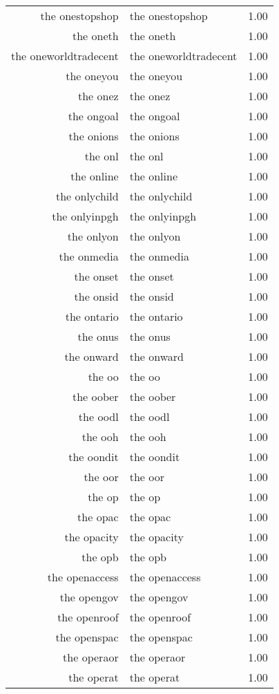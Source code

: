 \begin{table}[ht]
\begin{tabular}{rlr}
  the onestopshop & the onestopshop & 1.00 \\ 
  the oneth & the oneth & 1.00 \\ 
  the oneworldtradecent & the oneworldtradecent & 1.00 \\ 
  the oneyou & the oneyou & 1.00 \\ 
  the onez & the onez & 1.00 \\ 
  the ongoal & the ongoal & 1.00 \\ 
  the onions & the onions & 1.00 \\ 
  the onl & the onl & 1.00 \\ 
  the online & the online & 1.00 \\ 
  the onlychild & the onlychild & 1.00 \\ 
  the onlyinpgh & the onlyinpgh & 1.00 \\ 
  the onlyon & the onlyon & 1.00 \\ 
  the onmedia & the onmedia & 1.00 \\ 
  the onset & the onset & 1.00 \\ 
  the onsid & the onsid & 1.00 \\ 
  the ontario & the ontario & 1.00 \\ 
  the onus & the onus & 1.00 \\ 
  the onward & the onward & 1.00 \\ 
  the oo & the oo & 1.00 \\ 
  the oober & the oober & 1.00 \\ 
  the oodl & the oodl & 1.00 \\ 
  the ooh & the ooh & 1.00 \\ 
  the oondit & the oondit & 1.00 \\ 
  the oor & the oor & 1.00 \\ 
  the op & the op & 1.00 \\ 
  the opac & the opac & 1.00 \\ 
  the opacity & the opacity & 1.00 \\ 
  the opb & the opb & 1.00 \\ 
  the openaccess & the openaccess & 1.00 \\ 
  the opengov & the opengov & 1.00 \\ 
  the openroof & the openroof & 1.00 \\ 
  the openspac & the openspac & 1.00 \\ 
  the operaor & the operaor & 1.00 \\ 
  the operat & the operat & 1.00 \\ 

\end{tabular}
\end{table}
